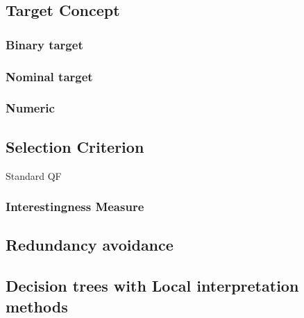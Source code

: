 \subsection{Target Concept}

	\subsubsection{Binary target}
	\subsubsection{Nominal target}
	\subsubsection{Numeric}

\subsection{Selection Criterion}
Standard QF
\subsubsection{Interestingness Measure}
	
\subsection{Redundancy avoidance}

\subsection{Decision trees with Local interpretation methods}